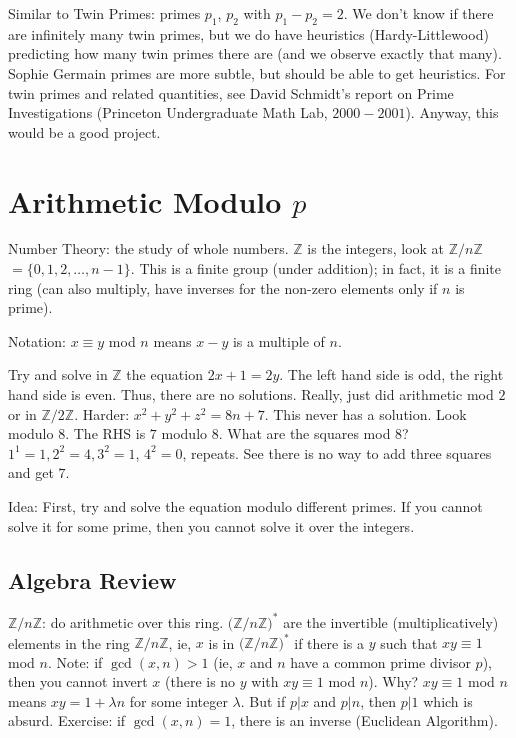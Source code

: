 \documentclass[12pt,letterpaper]{report}
\newcommand{\Z}{\ensuremath{\mathbb{Z}}}
\begin{document}
Similar to Twin Primes: primes $p_1$, $p_2$ with $p_1 - p_2 = 2$.
We don't know if there are infinitely many twin primes, but we do
have heuristics (Hardy-Littlewood) predicting how many twin primes
there are (and we observe exactly that many). Sophie Germain
primes are more subtle, but should be able to get heuristics. For
twin primes and related quantities, see David Schmidt's report on
Prime Investigations (Princeton Undergraduate Math Lab,
$2000-2001$). Anyway, this would be a good project.

\section{Arithmetic Modulo $p$}

Number Theory: the study of whole numbers. $\Z$ is the integers,
look at $\Z / n\Z$ $= \{0,1,2,\dots, n-1\}$. This is a finite
group (under addition); in fact, it is a finite ring (can also
multiply, have inverses for the non-zero elements only if $n$ is
prime).

Notation: $x \equiv y$ mod $n$ means $x-y$ is a multiple of $n$.

Try and solve in $\Z$ the equation $2x + 1 = 2y$. The left hand
side is odd, the right hand side is even. Thus, there are no
solutions. Really, just did arithmetic mod $2$ or in $\Z/ 2\Z$.
Harder: $x^2 + y^2 + z^2 = 8n + 7$. This never has a solution.
Look modulo $8$. The RHS is $7$ modulo $8$. What are the squares
mod $8$? $1^1 = 1, 2^2 = 4, 3^2 = 1$, $4^2 = 0$, repeats. See
there is no way to add three squares and get $7$.

Idea: First, try and solve the equation modulo different primes.
If you cannot solve it for some prime, then you cannot solve it
over the integers.

\subsection{Algebra Review}

$\Z / n\Z$: do arithmetic over this ring. $\Big(\Z / n\Z
\Big)^{*}$ are the invertible (multiplicatively) elements in the
ring $\Z / n\Z$, ie, $x$ is in $\Big(\Z / n\Z \Big)^{*}$ if there
is a $y$ such that $xy \equiv 1$ mod $n$. Note: if $\gcd(x,n) > 1$
(ie, $x$ and $n$ have a common prime divisor $p$), then you cannot
invert $x$ (there is no $y$ with $xy \equiv 1$ mod $n$). Why? $xy
\equiv 1$ mod $n$ means $xy = 1 + \lambda n$ for some integer
$\lambda$. But if $p|x$ and $p|n$, then $p|1$ which is absurd.
Exercise: if $\gcd(x,n) = 1$, there is an inverse (Euclidean
Algorithm).
\end{document}
